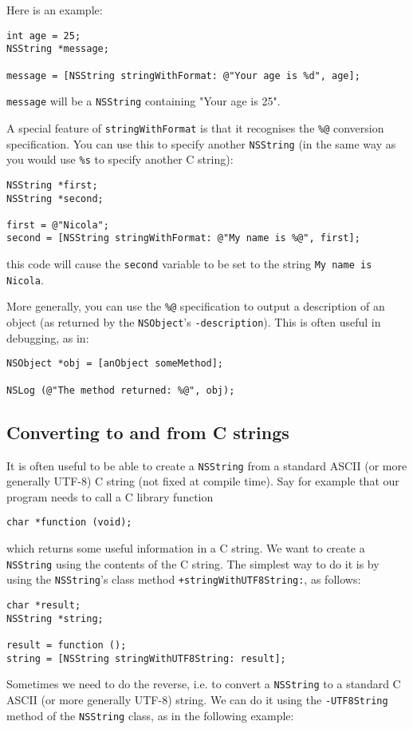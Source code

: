 \documentclass[a4paper]{article}
\begin{document}
Here is an example: 
\begin{verbatim}
int age = 25;
NSString *message;

message = [NSString stringWithFormat: @"Your age is %d", age];
\end{verbatim}

\texttt{message} will be a \texttt{NSString} containing "Your age is 25".

A special feature of \texttt{stringWithFormat} is that it recognises
the \texttt{\%@} conversion specification.  You can use this to 
specify another \texttt{NSString} (in the same way as you would use 
\texttt{\%s} to specify another C string): 
\begin{verbatim}
NSString *first;
NSString *second;

first = @"Nicola";
second = [NSString stringWithFormat: @"My name is %@", first];
\end{verbatim}
this code will cause the \texttt{second} variable to be set to 
the string \texttt{My name is Nicola}. 

More generally, you can use the \texttt{\%@} specification to output a
description of an object (as returned by the \texttt{NSObject}'s
\texttt{-description}).  This is often useful in debugging, as in: 
\begin{verbatim}
NSObject *obj = [anObject someMethod];

NSLog (@"The method returned: %@", obj);
\end{verbatim}

\subsection{Converting to and from C strings}
It is often useful to be able to create a \texttt{NSString} from a
standard ASCII (or more generally UTF-8) C string (not fixed at
compile time).  Say for example that our program needs to call a C
library function
\begin{verbatim}
char *function (void);
\end{verbatim}
which returns some useful information in a C string.  We want to
create a \texttt{NSString} using the contents of the C string. 
The simplest way to do it is by using the \texttt{NSString}'s 
class method \texttt{+stringWithUTF8String:}, as follows: 
\begin{verbatim}
char *result;
NSString *string;

result = function ();
string = [NSString stringWithUTF8String: result];
\end{verbatim}
Sometimes we need to do the reverse, i.e. to convert a
\texttt{NSString} to a standard C ASCII (or more generally UTF-8)
string.  We can do it using the \texttt{-UTF8String} method of the
\texttt{NSString} class, as in the following example:
\end{document}
